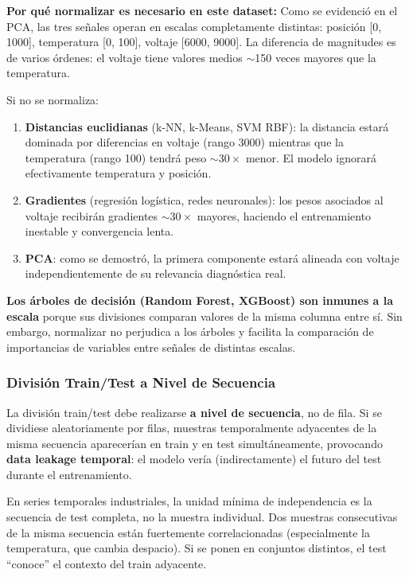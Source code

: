 \documentclass[12pt,a4paper]{article}
\begin{document}
\begin{whybox}
\textbf{Por qué normalizar es necesario en este dataset:}
Como se evidenció en el PCA, las tres señales operan en escalas completamente distintas:
posición [0, 1000], temperatura [0, 100], voltaje [6000, 9000]. La diferencia de
magnitudes es de varios órdenes: el voltaje tiene valores medios $\sim$150 veces
mayores que la temperatura.

Si no se normaliza:
\begin{enumerate}[leftmargin=1.5em]
  \item \textbf{Distancias euclidianas} (k-NN, k-Means, SVM RBF): la distancia
    estará dominada por diferencias en voltaje (rango 3000) mientras que la
    temperatura (rango 100) tendrá peso $\sim 30\times$ menor. El modelo ignorará
    efectivamente temperatura y posición.
  \item \textbf{Gradientes} (regresión logística, redes neuronales): los pesos
    asociados al voltaje recibirán gradientes $\sim 30\times$ mayores, haciendo
    el entrenamiento inestable y convergencia lenta.
  \item \textbf{PCA}: como se demostró, la primera componente estará alineada con
    voltaje independientemente de su relevancia diagnóstica real.
\end{enumerate}

\textbf{Los árboles de decisión (Random Forest, XGBoost) son inmunes a la escala}
porque sus divisiones comparan valores de la misma columna entre sí. Sin embargo,
normalizar no perjudica a los árboles y facilita la comparación de importancias de
variables entre señales de distintas escalas.
\end{whybox}

\subsubsection{División Train/Test a Nivel de Secuencia}

\begin{notebox}
La división train/test debe realizarse \textbf{a nivel de secuencia}, no de fila.
Si se dividiese aleatoriamente por filas, muestras temporalmente adyacentes de la
misma secuencia aparecerían en train y en test simultáneamente, provocando
\textbf{data leakage temporal}: el modelo vería (indirectamente) el futuro del test
durante el entrenamiento.

En series temporales industriales, la unidad mínima de independencia es la secuencia
de test completa, no la muestra individual. Dos muestras consecutivas de la misma
secuencia están fuertemente correlacionadas (especialmente la temperatura, que cambia
despacio). Si se ponen en conjuntos distintos, el test ``conoce'' el contexto del
train adyacente.
\end{notebox}
\end{document}
